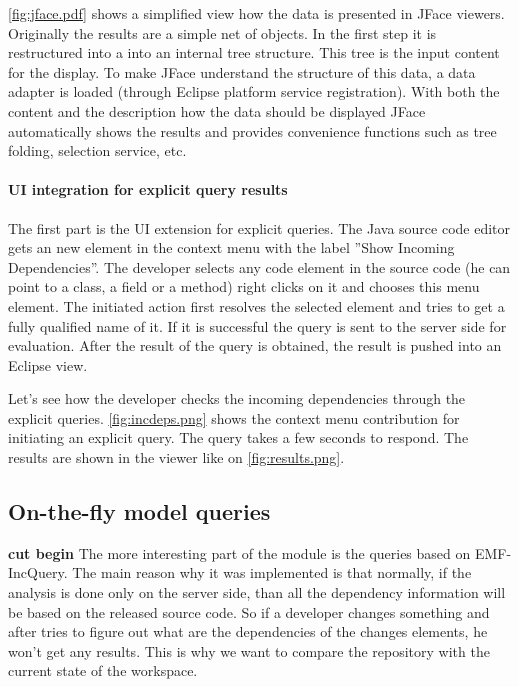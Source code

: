 
\autoref{fig:jface.pdf} shows a simplified view how the data is presented in
JFace viewers. Originally the results are a simple net of objects. In the first
step it is restructured into a into an internal tree structure. This tree is the
input content for the display. To make JFace understand  the structure of this
data, a data adapter is loaded (through Eclipse platform service registration).
With both the content and the description how the data should be displayed JFace
automatically shows the results and provides convenience functions such as tree
folding, selection service, etc. 


\paragraph{UI integration for explicit query results} 
The first part is the UI extension for explicit queries. The Java source code
editor gets an new element in the context menu with the label ''Show Incoming
Dependencies''. The developer selects any code element in the source code (he
can point to a class, a field or a method) right clicks on it and chooses this
menu element. The initiated action first resolves the selected element and tries
to get a fully qualified name of it. If it is successful the query is sent to
the server side for evaluation. After the result of the query is obtained, the 
result is pushed into an Eclipse view.

Let's see how the developer checks the incoming dependencies through the
explicit queries.
\autoref{fig:incdeps.png} shows the context menu contribution for initiating an
explicit query. The query takes a few seconds to respond. The results are shown
in the viewer like on \autoref{fig:results.png}.


\subsection{On-the-fly model queries}

\textbf{cut begin}
The more interesting part of the module is the queries based on EMF-IncQuery.
The main reason why it was implemented is that normally, if the analysis is done
only on the server side, than all the dependency information will be based on
the released source code. So if a developer changes something and after tries to
figure out what are the dependencies of the changes elements, he won't get any
results. This is why we want to compare the repository with the current state of
the workspace.

